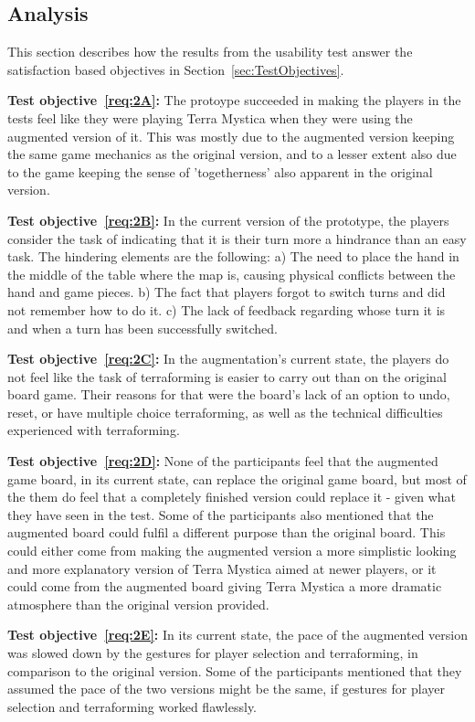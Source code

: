 \subsection{Analysis}\label{subsec:analysis}
This section describes how the results from the usability test answer the satisfaction based objectives in Section~\ref{sec:TestObjectives}.

\textbf{Test objective~\ref{req:2A}:} The protoype succeeded in making the players in the tests feel like they were playing Terra Mystica when they were using the augmented version of it. This was mostly due to the augmented version keeping the same game mechanics as the original version, and to a lesser extent also due to the game keeping the sense of 'togetherness' also apparent in the original version.

\textbf{Test objective~\ref{req:2B}:} In the current version of the prototype, the players consider the task of indicating that it is their turn more a hindrance than an easy task. The hindering elements are the following: a) The need to place the hand in the middle of the table where the map is, causing physical conflicts between the hand and game pieces. b) The fact that players forgot to switch turns and did not remember how to do it. c) The lack of feedback regarding whose turn it is and when a turn has been successfully switched. 

\textbf{Test objective~\ref{req:2C}:} In the augmentation's current state, the players do not feel like the task of terraforming is easier to carry out than on the original board game. Their reasons for that were the board's lack of an option to undo, reset, or have multiple choice terraforming, as well as the technical difficulties experienced with terraforming. 

\textbf{Test objective~\ref{req:2D}:} None of the participants feel that the augmented game board, in its current state, can replace the original game board, but most of the them do feel that a completely finished version could replace it - given what they have seen in the test. Some of the participants also mentioned that the augmented board could fulfil a different purpose than the original board. This could either come from making the augmented version a more simplistic looking and more explanatory version of Terra Mystica aimed at newer players, or it could come from the augmented board giving Terra Mystica a more dramatic atmosphere than the original version provided.

\textbf{Test objective~\ref{req:2E}:} In its current state, the pace of the augmented version was slowed down by the gestures for player selection and terraforming, in comparison to the original version. Some of the participants mentioned that they assumed the pace of the two versions might be the same, if gestures for player selection and terraforming worked flawlessly. 